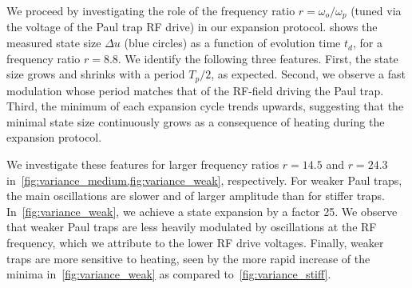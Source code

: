 We proceed by investigating the role of the frequency ratio $r=\omega_o/\omega_p$ (tuned via the voltage of the Paul trap RF drive) in our expansion protocol.
 shows the measured state size $\Delta u$ (blue circles) as a function of evolution time $t_d$, for a frequency ratio $r=8.8$. 
We identify the following three features.
First, the state size grows and shrinks with a period $T_p/2$, as expected.
Second, we observe a fast modulation whose period matches that of the RF-field driving the Paul trap.
Third, the minimum of each expansion cycle trends upwards, suggesting that the minimal state size continuously grows as a consequence of heating during the expansion protocol.


We investigate these features for larger frequency ratios $r=14.5$ and $r=24.3$ in~\cref{fig:variance_medium,fig:variance_weak}, respectively. 
For weaker Paul traps, the main oscillations are slower and of larger amplitude than for stiffer traps. In~\cref{fig:variance_weak}, we achieve a state expansion by a factor 25.
We observe that weaker Paul traps are less heavily modulated by oscillations at the RF frequency, which we attribute to the lower RF drive voltages. Finally, weaker traps are more sensitive to heating, seen by the more rapid increase of the minima in~\cref{fig:variance_weak} as  compared to~\cref{fig:variance_stiff}.



